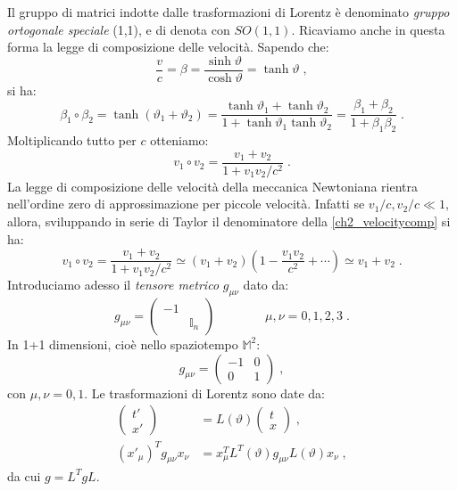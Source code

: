 Il gruppo di matrici indotte dalle trasformazioni di Lorentz è denominato \textit{gruppo ortogonale speciale} (1,1), e di denota con 
$SO(1,1)$. Ricaviamo anche in questa forma la legge di composizione delle velocità. Sapendo che:
\begin{equation}
\frac{v}{c}=\beta=\frac{\sinh\vartheta}{\cosh\vartheta}=\tanh\vartheta\;,
\end{equation}
si ha:
\begin{equation}
\beta_1\circ\beta_2=\tanh(\vartheta_1+\vartheta_2)=\frac{\tanh\vartheta_1+\tanh\vartheta_2}{1+\tanh\vartheta_1\tanh\vartheta_2}=
\frac{\beta_1+\beta_2}{1+\beta_1\beta_2}\;.
\end{equation}
Moltiplicando tutto per $c$ otteniamo:
\begin{equation}
v_1\circ v_2=\frac{v_1+v_2}{1+v_1v_2/c^2}\;. \label{ch2_velocitycomp}
\end{equation}
La legge di composizione delle velocità della meccanica Newtoniana rientra nell'ordine zero di approssimazione per piccole velocità.
Infatti se $v_1/c,v_2/c\ll 1$, allora, sviluppando in serie di Taylor il denominatore della \eqref{ch2_velocitycomp} si ha:
\begin{equation}
v_1\circ v_2 =\frac{v_1+v_2}{1+v_1v_2/c^2}\simeq (v_1+v_2)\left(1-\frac{v_1v_2}{c^2}+\cdots\right)\simeq v_1+v_2\;.
\end{equation}
Introduciamo adesso il \textit{tensore metrico} $g_{\mu\nu}$ dato da:
\begin{equation}
 g_{\mu\nu}=\left(\begin{matrix}
                   -1 & {} \\
{} & \mathbb{I}_n
                  \end{matrix}\right) \qquad \qquad \mu,\nu=0,1,2,3\;.
\end{equation}
In 1+1 dimensioni, cioè nello spaziotempo $\mathbb{M}^2$:
\begin{equation}
g_{\mu\nu}=\begin{pmatrix}
-1 & 0 \\
0 & 1
\end{pmatrix}\;,
\end{equation}
con $\mu,\nu=0,1$. Le trasformazioni di Lorentz sono date da:
\begin{align}
\begin{pmatrix}
t' \\
x'
\end{pmatrix} &= L(\vartheta)\begin{pmatrix}
t \\
x
\end{pmatrix}\;, \\
(x'_{\mu})^Tg_{\mu\nu}x_{\nu} &= x_{\mu}^TL^T(\vartheta)g_{\mu\nu}L(\vartheta)x_{\nu}\;,
\end{align}
da cui $g=L^TgL$. \\

